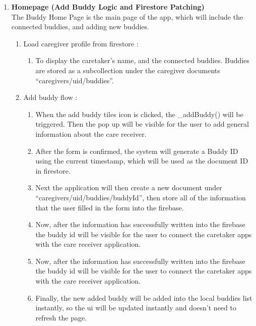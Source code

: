 \begin{enumerate}[leftmargin=2.2cm]
\begin{enumerate}[leftmargin=1.2cm, label=\arabic*.]
	\end{enumerate}
	
	\item\textbf{Homepage (Add Buddy Logic and Firestore Patching)} 
	\\The Buddy Home Page is the main page of the app, which will include the connected buddies, and adding new buddies.
	
	\begin{enumerate}[leftmargin=1.2cm, label=\arabic*.]
		
		\item Load caregiver profile from firestore :
		\begin{enumerate}[label=\alph*.] 
			\item To display the caretaker’s name, and the connected buddies. Buddies are stored as a subcollection under the caregiver documents “caregivers/{uid}/buddies”.
		\end{enumerate}
		
		\item Add buddy flow :
		\begin{enumerate}[label=\alph*.] 
			\item When the add buddy tiles icon is clicked, the \_addBuddy() will be triggered. Then the pop up will be visible for the user to add general information about the care receiver.
			\item After the form is confirmed, the system will generate a Buddy ID using the current timestamp, which will be used as the document ID in firestore.
			
			\item Next the application will then create a new document under “caregivers/{uid}/buddies/{buddyId}”, then store all of the information that the user filled in the form into the firebase.
			\item Now, after the information has successfully written into the firebase the buddy id will be visible for the user to connect the caretaker apps with the care receiver application.
			\item Now, after the information has successfully written into the firebase the buddy id will be visible for the user to connect the caretaker apps with the care receiver application.
			\item Finally, the new added buddy will be added into the local buddies list instantly, so the ui will be updated instantly and doesn't need to refresh the page.
		\end{enumerate}
		

\end{enumerate}
\end{enumerate}

